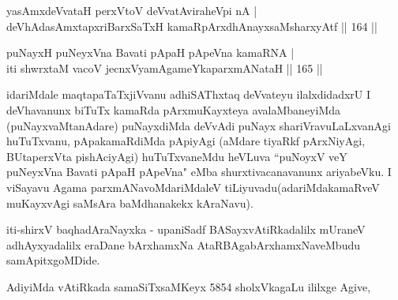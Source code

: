 
\begin{shl}
yasAmxdeVvataH perxVtoV deVvatAviraheV\s pi nA |\\
deVhAdasAmxtapxriBarxSaTxH kamaRpArxdhAnayxsaMsharxyAtf \hfill || 164 ||
\end{shl}

\begin{shl}
puNayxH puNeyxVna Bavati pApaH pApeVna kamaRNA |\\
iti shwrxtaM vacoV jecnxVyamAgameYkaparxmANataH \hfill || 165 ||
\end{shl}

\begin{artha}
idariMdale maqtapaTaTxjiVvanu adhiSAThxtaq deVvateyu ilalxdidadxrU I deVhavanunx biTuTx kamaRda pArxmuKayxteya avalaMbaneyiMda (puNayxvaMtanAdare) puNayxdiMda deVvAdi puNayx shariVravuLaLxvanAgi huTuTxvanu, pApakamaRdiMda pApiyAgi (aMdare tiyaRkf pArxNiyAgi, BUtaperxVta pishAciyAgi) huTuTxvaneMdu heVLuva ``puNoyxV veY puNeyxVna Bavati pApaH pApeVna" eMba shurxtivacanavanunx ariyabeVku. I viSayavu Agama parxmANavoMdariMdaleV tiLiyuvadu(adariMdakamaRveV muKayxvAgi saMsAra baMdhanakekx kAraNavu).
\end{artha}

\begin{center}
iti-shirxV baqhadAraNayxka - upaniSadf BASayxvAtiRkadalilx mUraneV adhAyxyadalilx eraDane bArxhamxNa AtaRBAgabArxhamxNaveMbudu samApitxgoMDide.
\end{center}

\begin{center}
AdiyiMda vAtiRkada samaSiTxsaMKeyx 5854 sholxVkagaLu ililxge Agive,
\end{center}
